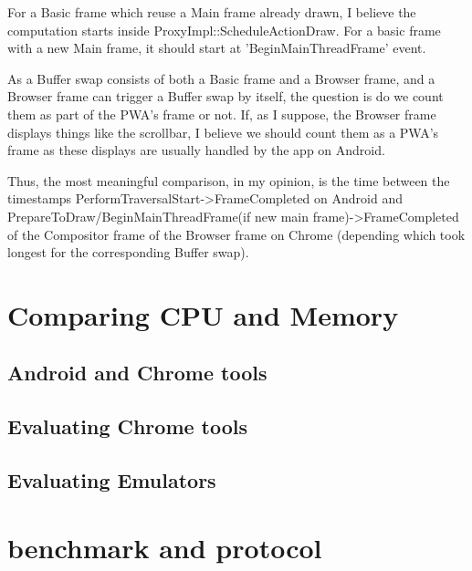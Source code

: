 For a Basic frame which reuse a Main frame already drawn, I believe the computation starts inside ProxyImpl::ScheduleActionDraw. For a basic frame with a new Main frame, it should start at 'BeginMainThreadFrame' event. 

As a Buffer swap consists of both a Basic frame and a Browser frame, and a Browser frame can trigger a Buffer swap by itself, the question is do we count them as part of the PWA's frame or not. If, as I suppose, the Browser frame displays things like the scrollbar, I believe we should count them as a PWA's frame as these displays are usually handled by the app on Android. 

Thus, the most meaningful comparison, in my opinion, is the time between the timestamps PerformTraversalStart->FrameCompleted on Android and PrepareToDraw/BeginMainThreadFrame(if new main frame)->FrameCompleted of the Compositor frame of the Browser frame on Chrome (depending which took longest for the corresponding Buffer swap).

\fi
    
\section{Comparing CPU and Memory}
    \subsection{Android and Chrome tools}
    \subsection{Evaluating Chrome tools}
    \subsection{Evaluating Emulators}
\section{benchmark and protocol}

